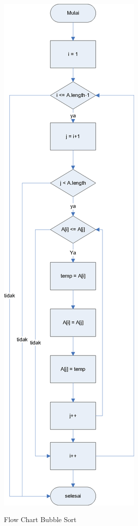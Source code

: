 \begin{marginfigure}%
\includegraphics[scale=0.6]{fig/flowchart.eps}%
\caption{Flow Chart Bubble Sort}%
\label{fig:flowchart}%
\end{marginfigure}

